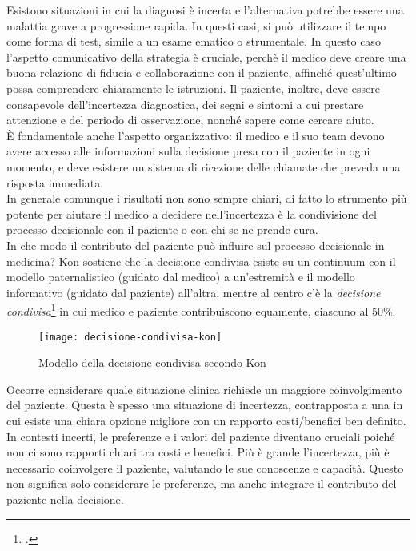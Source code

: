 Esistono situazioni in cui la diagnosi è incerta e l'alternativa potrebbe essere una malattia grave a progressione rapida. In questi casi, si può utilizzare il tempo come forma di test, simile a un esame ematico o strumentale. In questo caso l'aspetto comunicativo della strategia è cruciale, perchè il medico deve creare una buona relazione di fiducia e collaborazione con il paziente, affinché quest'ultimo possa comprendere chiaramente le istruzioni. Il paziente, inoltre, deve essere consapevole dell'incertezza diagnostica, dei segni e sintomi a cui prestare attenzione e del periodo di osservazione, nonché sapere come cercare aiuto.\\
È fondamentale anche l'aspetto organizzativo: il medico e il suo team devono avere accesso alle informazioni sulla decisione presa con il paziente in ogni momento, e deve esistere un sistema di ricezione delle chiamate che preveda una risposta immediata.\\
In generale comunque i risultati non sono sempre chiari, di fatto lo strumento più potente per aiutare il medico a decidere nell'incertezza è la condivisione del processo decisionale con il paziente o con chi se ne prende cura.\\

In che modo il contributo del paziente può influire sul processo decisionale in medicina? Kon sostiene che la decisione condivisa esiste su un continuum con il modello paternalistico (guidato dal medico) a un'estremità e il modello informativo (guidato dal paziente) all'altra, mentre al centro c'è la \textit{decisione condivisa}\footcite{womak:decisione-condivisa-kon} in cui medico e paziente contribuiscono equamente, ciascuno al 50\%.\\


\begin{figure}[!ht] 
    \centering 
    \texttt{[image: decisione-condivisa-kon]} 
    \caption{Modello della decisione condivisa secondo Kon}
\end{figure}

Occorre considerare quale situazione clinica richiede un maggiore coinvolgimento del paziente. Questa è spesso una situazione di incertezza, contrapposta a una in cui esiste una chiara opzione migliore con un rapporto costi/benefici ben definito. In contesti incerti, le preferenze e i valori del paziente diventano cruciali poiché non ci sono rapporti chiari tra costi e benefici. Più è grande l'incertezza, più è necessario coinvolgere il paziente, valutando le sue conoscenze e capacità. Questo non significa solo considerare le preferenze, ma anche integrare il contributo del paziente nella decisione.\\

